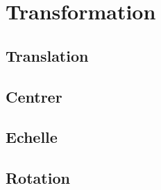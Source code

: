 \documentclass[../CSC_5RO17_TA_TP4.tex]{subfiles}
\begin{document}
\section{Transformation}
\subsection{Translation}
\subsection{Centrer}
\subsection{Echelle}
\subsection{Rotation}
\end{document}
